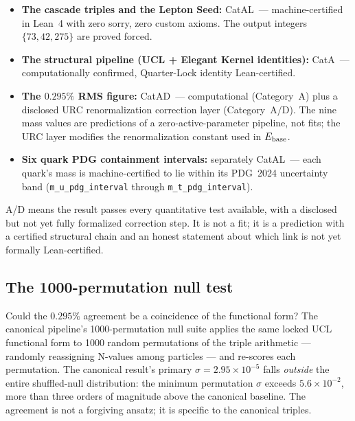 \documentclass[11pt,a4paper]{article}
\newcommand{\lean}[1]{\texttt{#1}}
\newcommand{\CatAL}{\textsf{CatAL}}
\newcommand{\CatA}{\textsf{CatA}}
\newcommand{\CatAD}{\textsf{CatAD}}
\begin{document}
\begin{tcolorbox}[colback=boxred,colframe=red!50!black,title=Certification status]
\begin{itemize}[itemsep=3pt]
  \item \textbf{The cascade triples and the Lepton Seed:} \CatAL\ ---
    machine-certified in Lean~4 with zero sorry, zero custom axioms.
    The output integers $\{73, 42, 275\}$ are proved forced.
  \item \textbf{The structural pipeline (UCL + Elegant Kernel identities):}
    \CatA\ --- computationally confirmed, Quarter-Lock identity Lean-certified.
  \item \textbf{The $0.295\%$ RMS figure:} \CatAD\ --- computational (Category~A)
    plus a disclosed URC renormalization correction layer (Category~A/D).
    The nine mass values are predictions of a zero-active-parameter pipeline, not
    fits; the URC layer modifies the renormalization constant used in $E_{\rm base}$.
  \item \textbf{Six quark PDG containment intervals:} separately \CatAL\ --- each
    quark's mass is machine-certified to lie within its PDG~2024 uncertainty band
    (\lean{m\_u\_pdg\_interval} through \lean{m\_t\_pdg\_interval}).
\end{itemize}
A/D means the result passes every quantitative test available, with a disclosed
but not yet fully formalized correction step.  It is not a fit; it is a prediction
with a certified structural chain and an honest statement about which link is
not yet formally Lean-certified.
\end{tcolorbox}

\subsection{The 1000-permutation null test}

Could the $0.295\%$ agreement be a coincidence of the functional form?  The canonical
pipeline's 1000-permutation null suite applies the same locked UCL functional form to
1000 random permutations of the triple arithmetic --- randomly reassigning N-values
among particles --- and re-scores each permutation.  The canonical result's primary
$\sigma = 2.95\times10^{-5}$ falls \emph{outside} the entire shuffled-null
distribution: the minimum permutation $\sigma$ exceeds $5.6\times10^{-2}$, more
than three orders of magnitude above the canonical baseline.  The agreement is not
a forgiving ansatz; it is specific to the canonical triples.
\end{document}
